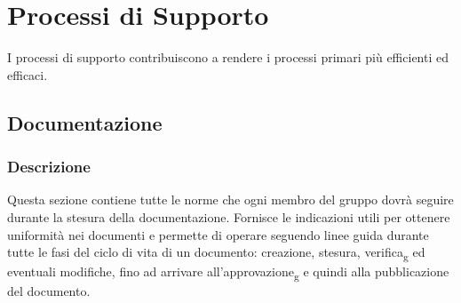 \section{Processi di Supporto}
I processi di supporto contribuiscono a rendere i processi primari più
efficienti ed efficaci.
\subsection{Documentazione}
\subsubsection{Descrizione}
Questa sezione contiene tutte le norme che ogni membro del gruppo dovrà seguire
durante la stesura della documentazione. Fornisce le indicazioni utili per
ottenere uniformità nei documenti e permette di operare seguendo linee guida
durante tutte le fasi del ciclo di vita di un documento: creazione, stesura,
verifica\textsubscript{g} ed eventuali modifiche, fino ad arrivare
all'approvazione\textsubscript{g} e quindi alla pubblicazione del documento.
